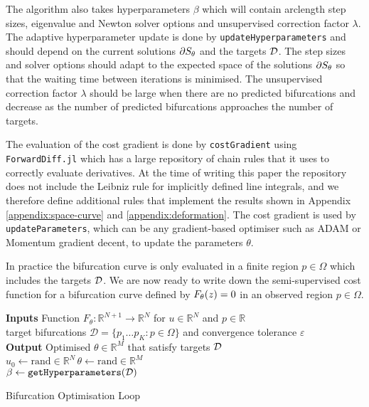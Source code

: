 The algorithm also takes hyperparameters $\beta$ which will contain arclength step sizes, eigenvalue and Newton solver options and unsupervised correction factor $\lambda$. The adaptive hyperparameter update is done by \texttt{updateHyperparameters} and should depend on the current solutions $\partial S_{\theta}$ and the targets $\mathcal{D}$. The step sizes and solver options should adapt to the expected space of the solutions $\partial S_{\theta}$ so that the waiting time between iterations is minimised. The unsupervised correction factor $\lambda$ should be large when there are no predicted bifurcations and decrease as the number of predicted bifurcations approaches the number of targets.

The evaluation of the cost gradient is done by \texttt{costGradient} using \texttt{ForwardDiff.jl} \cite{Revels2016Forward-ModeJulia} which has a large repository of chain rules that it uses to correctly evaluate derivatives. At the time of writing this paper the repository does not include the Leibniz rule \cite{Flanders1973DifferentiationSign} for implicitly defined line integrals, and we therefore define additional rules that implement the results shown in Appendix \ref{appendix:space-curve} and \ref{appendix:deformation}. The cost gradient is used by \texttt{updateParameters}, which can be any gradient-based optimiser such as ADAM or Momentum gradient decent, to update the parameters $\theta$.

In practice the bifurcation curve is only evaluated in a finite region $p\in\Omega$ which includes the targets $\mathcal{D}$. We are now ready to write down the semi-supervised cost function for a bifurcation curve defined by $F_{\theta}(z)=0$ in an observed region $p\in\Omega$.

\begin{algorithm*}[H]
\label{alg:optimisation-loop}
\SetAlgoLined
\textbf{Inputs} Function $F_{\theta}:\mathbb{R}^{N+1}\rightarrow\mathbb{R}^{N}$ for $u\in\mathbb{R}^N$ and $p\in\mathbb{R}$\\ target bifurcations $\mathcal{D}=\{p_1\dots p_K:p\in\Omega\}$ and convergence tolerance $\varepsilon$\\
\textbf{Output} Optimised $\theta\in\mathbb{R}^M$ that satisfy targets $\mathcal{D}$\\
$u_0\leftarrow\mathrm{rand}\in\mathbb{R}^{N}$\quad\,$\theta\leftarrow\mathrm{rand}\in\mathbb{R}^{M}$\\
$\beta\leftarrow\texttt{getHyperparameters}(\mathcal{D})$\\
\caption{Bifurcation Optimisation Loop}
\end{algorithm*}

